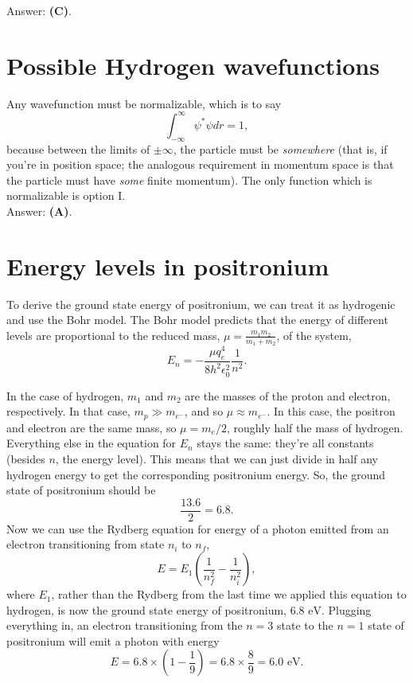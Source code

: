 \documentclass[11pt]{paper}
\newcommand{\answer}[1]{Answer: \textbf{(#1)}.}
\begin{document}
\answer{C}

\section{Possible Hydrogen wavefunctions}
Any wavefunction must be normalizable, which is to say
\begin{equation}
\int_{-\infty}^\infty \psi^*\psi dr = 1,
\end{equation}
because between the limits of $\pm\infty$, the particle must be \emph{somewhere} (that is, if you're in position space; the analogous requirement in momentum space is that the particle must have \emph{some} finite momentum).  The only function which is normalizable is option I.\\

\answer{A}  

\section{Energy levels in positronium}
To derive the ground state energy of positronium, we can treat it as hydrogenic and use the Bohr model.  The Bohr model predicts that the energy of different levels are proportional to the reduced mass, $\mu = \frac{m_1 m_2}{m_1 + m_2}$, of the system,
\begin{equation}
E_n = -\frac{\mu q_e^4}{8 h^2\epsilon_0^2} \frac{1}{n^2}.
\end{equation}

In the case of hydrogen, $m_1$ and $m_2$ are the masses of the proton and electron, respectively.  In that case, $m_p \gg m_{e^-}$, and so $\mu\approx m_{e^-}$.  In this case, the positron and electron are the same mass, so $\mu = m_e/2$, roughly half the mass of hydrogen.  Everything else in the equation for $E_n$ stays the same: they're all constants (besides $n$, the energy level).  This means that we can just divide in half any hydrogen energy to get the corresponding positronium energy.  So, the ground state of positronium should be
\begin{equation}
\frac{13.6}{2} = 6.8.
\end{equation}
Now we can use the Rydberg equation for energy of a photon emitted from an electron transitioning from state $n_i$ to $n_f$,
\begin{equation}
E = E_1 \left(\frac{1}{n_f^2} - \frac{1}{n_i^2}\right),
\end{equation}
where $E_1$, rather than the Rydberg from the last time we applied this equation to hydrogen, is now the ground state energy of positronium, $6.8 \text{ eV}$.  Plugging everything in, an electron transitioning from the $n = 3$ state to the $n=1$ state of positronium will emit a photon with energy
\begin{equation}
E = 6.8 \times \left(1 - \frac{1}{9}\right) = 6.8 \times \frac{8}{9} = 6.0 \text{ eV}.
\end{equation}
\end{document}
